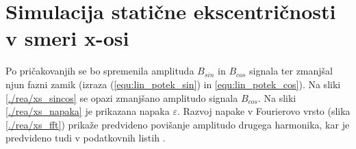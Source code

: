 \section{Simulacija statične ekscentričnosti v smeri x-osi}
Po pričakovanjih se bo spremenila amplituda $B_{sin}$ in $B_{cos}$ signala ter zmanjšal njun fazni zamik (izraza (\ref{equ:lin_potek_sin}) in \ref{equ:lin_potek_cos}). Na sliki \ref{./rea/xs_sincos} se opazi zmanjšano amplitudo signala $B_{cos}$. Na sliki \ref{./rea/xs_napaka} je prikazana napaka $\varepsilon$.  Razvoj napake v Fourierovo vrsto (slika \ref{./rea/xs_fft}) prikaže predvideno povišanje amplitudo drugega harmonika, kar je predvideno tudi v podatkovnih listih \cite{AM8192}.
\newpage
